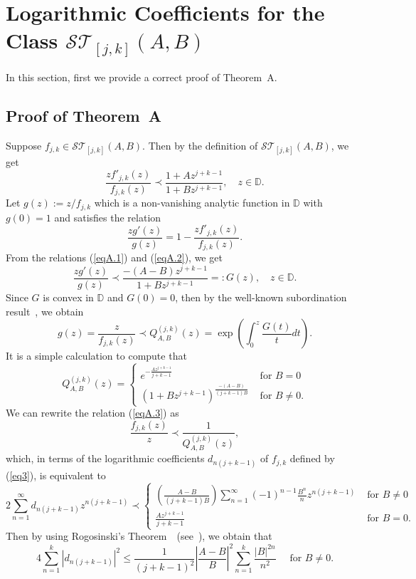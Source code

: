 \documentclass[12pt]{amsart}
\numberwithin{equation}{section}
\theoremstyle{definition}
\numberwithin{equation}{section}
\newcommand{\T}{{\mathcal T}}
\newcommand{\es}{{\mathcal S}}
\newcommand{\D}{{\mathbb D}}
\begin{document}
\section{Logarithmic Coefficients for the Class $\mathcal{ST}_{[j,k]}(A,B)$} 

In this section, first we provide a correct proof of Theorem~A.

\subsection*{Proof of Theorem~A}
Suppose $f_{j,k} \in \es \T_{[j,k]}(A,B)$. Then by the definition of $\es \T_{[j,k]}(A,B)$, we get
\begin{equation}\label{eqA.1}    
\frac{zf'_{j,k}(z)}{f_{j,k}(z)}\prec \frac{1+Az^{j+k-1}}{1+Bz^{j+k-1}}, \quad   z\in \D . 
\end{equation}
Let $g(z):=z/f_{j,k}$ which is a non-vanishing analytic function in $\D$ with $g(0)=1$ and satisfies the relation
\begin{equation}\label{eqA.2}   
\frac{zg'(z)}{ g(z)} = 1- \frac{zf'_{j,k}(z)}{f_{j,k}(z)}. 
\end{equation}
From the relations (\ref{eqA.1}) and (\ref{eqA.2}), we get
$$ \frac{zg'(z)}{g(z)}\prec \frac{-(A-B)z^{j+k-1}}{1+B z^{j+k-1}}=:G(z), \quad z\in \D.
$$
Since $G$ is convex in $\D$ and $G(0)=0$, then by the well-known subordination result~\cite[Corollary~3.1d.1, p.~76]{MM2000}, we obtain
\begin{equation}\label{eqA.3}
g(z)=\frac{z}{f_{j,k}(z)} \prec Q^{(j,k)}_{A,B}(z)=\exp \left(\int_0^{z}\frac{G(t)}{t} dt \right).
\end{equation}
It is a simple calculation to compute that
$$ \displaystyle Q^{(j,k)}_{A,B}(z)=
 \left \{
 \begin{array}{ll}
 e^{-\frac{Az^{j+k-1}}{j+k-1}} & \mbox{ for } B=0\\
 (1+Bz^{j+k-1})^{\frac{-(A-B)}{({j+k-1})B}} & \mbox{ for } B\neq 0.
 \end{array} \right.
$$
We can rewrite the relation (\ref{eqA.3}) as
$$ \frac{f_{j,k}(z)}{z}\prec \frac{1}{Q^{(j,k)}_{A,B}(z)},
$$
which, in terms of the logarithmic coefficients $ d_{n(j+k-1)}$ of $f_{j,k}$ defined by (\ref{eq3}), is equivalent to
$$ 2\sum_{n=1}^{\infty} d_{n(j+k-1)}z^{n(j+k-1)} \prec
\left \{
\begin{array}{ll}
\displaystyle
\left(\frac{A-B}{(j+k-1)B}\right)\sum_{n=1}^{\infty} (-1)^{n-1}\frac{B^n}{n}z^{n(j+k-1)}
& \mbox{ for } B\neq 0\\[6mm]
\frac{Az^{j+k-1}}{j+k-1}
& \mbox{ for } B= 0.
\end{array}\right.
$$
Then by using Rogosinski's Theorem~\cite[Theorem~6.3, p.~192]{Dur83}\, (see~\cite{Rog43}), we obtain that
$$  4\sum_{n=1}^{k} |d_{n(j+k-1)}|^2  \le \frac{1}{(j+k-1)^2}\left|\frac{A-B}{B}\right|^2\sum_{n=1}^{k} \frac{|B|^{2n}}{n^2}
 \quad \mbox{ for }B\neq 0.
 $$   %
\end{document}
